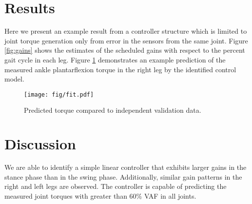 \documentclass[10pt,letterpaper,notitlepage,twocolumn]{article}
\begin{document}
\section*{Results}
%
Here we present an example result from a controller structure which is limited
to joint torque generation only from error in the sensors from the same joint.
Figure \ref{fig:gains} shows the estimates of the scheduled gains with respect
to the percent gait cycle in each leg. Figure \ref{fig:fit} demonstrates an
example prediction of the measured ankle plantarflexion torque in the right leg
by the identified control model.
%
\begin{figure}[b]
  \begin{center}
    \texttt{[image: fig/fit.pdf]}
    \caption{Predicted torque compared to independent validation data.}
    \label{fig:fit}
  \end{center}
\end{figure}
%
\section*{Discussion}
%
We are able to identify a simple linear controller that exhibits larger gains
in the stance phase than in the swing phase. Additionally, similar gain
patterns in the right and left legs are observed. The controller is capable of
predicting the measured joint torques with greater than 60\% VAF in all joints.
%
%
\end{document}
